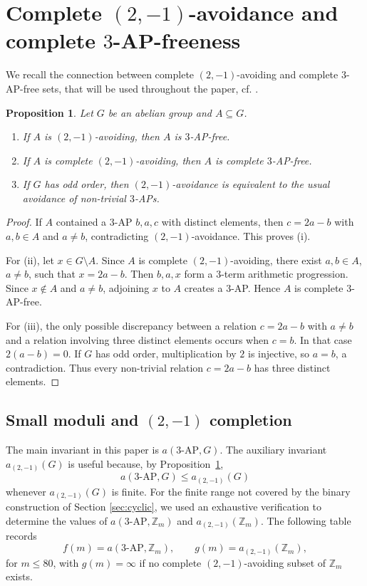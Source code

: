 \documentclass[11pt]{article}
\newtheorem{proposition}[theorem]{Proposition}
\newcommand{\Z}{\mathbb Z}
\newcommand{\AP}{\mathrm{AP}}
\newcommand{\aavo}{a_{(2,-1)}}
\begin{document}
	
	
	\section{Complete $(2,-1)$-avoidance and complete $3$-AP-freeness}
	
	We recall the connection between  complete $(2,-1)$-avoiding and complete $3$-AP-free sets, that will be used throughout the paper, cf. \cite{CsajbokNagy2025}.
	
	\begin{proposition}\label{prop:relation}
		Let $G$ be an abelian group and $A\subseteq G$.
		\begin{enumerate}[label=\textup{(\roman*)}]
			\item If $A$ is $(2,-1)$-avoiding, then $A$ is $3$-AP-free.
			\item If $A$ is complete $(2,-1)$-avoiding, then $A$ is complete $3$-AP-free.
			\item If $G$ has odd order, then $(2,-1)$-avoidance is equivalent to the usual avoidance of non-trivial $3$-APs.
		\end{enumerate}
	\end{proposition}
	
	\begin{proof}
		If $A$ contained a $3$-AP $b,a,c$ with distinct elements, then $c=2a-b$ with $a,b\in A$ and $a\ne b$, contradicting $(2,-1)$-avoidance.  This proves (i).
		
		For (ii), let $x\in G\setminus A$.  Since $A$ is complete $(2,-1)$-avoiding, there exist $a,b\in A$, $a\ne b$, such that $x=2a-b$.  Then $b,a,x$ form a $3$-term arithmetic progression.  Since $x\notin A$ and $a\ne b$, adjoining $x$ to $A$ creates a $3$-AP.  Hence $A$ is complete $3$-AP-free.
		
		For (iii), the only possible discrepancy between a relation $c=2a-b$ with $a\ne b$ and a relation involving three distinct elements occurs when $c=b$.  In that case $2(a-b)=0$.  If $G$ has odd order, multiplication by $2$ is injective, so $a=b$, a contradiction.  Thus every non-trivial relation $c=2a-b$ has three distinct elements.
	\end{proof}
	
	
	\subsection{Small moduli and  $(2,-1)$ completion}\label{sec:small-moduli}
	
	The main invariant in this paper is $a(3\text{-}\AP,G)$.  The auxiliary invariant $\aavo(G)$ is useful because, by Proposition~\ref{prop:relation},
	\[
	a(3\text{-}\AP,G)\le \aavo(G)
	\]
	whenever $\aavo(G)$ is finite.  For the finite range not covered by the binary construction of Section \ref{sec:cyclic}, we used an exhaustive verification to determine the values of     $a(3\text{-}\AP,\Z_m)$ and $\aavo(\Z_m).$  The following table records
	\[
	f(m)=a(3\text{-}\AP,\Z_m),
	\qquad
	g(m)=\aavo(\Z_m),
	\]
	for $m\le80$, with $g(m)=\infty$ if no complete $(2,-1)$-avoiding subset of $\Z_m$ exists.   
	
\end{document}
